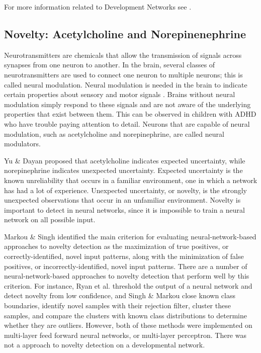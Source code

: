 \documentclass[conference]{IEEEtran}
\begin{document}
For more information related to Development Networks see \cite{WengIJCNN11,Weng3ThmRpt11}.

\subsection{Novelty: Acetylcholine and Norepinenephrine}
Neurotransmitters are chemicals that allow the transmission of signals across synapses from one neuron to another. In the brain, several classes of neurotransmitters are used to connect one neuron to multiple neurons; this is called neural modulation. Neural modulation is needed in the brain to indicate certain properties about
sensory and motor signals \cite{WengNAI12}. Brains without neural modulation simply
respond to these signals and are not aware of the underlying properties that exist between them. This can be observed in children with ADHD who have trouble paying attention to detail. Neurons that are capable of neural modulation, such as acetylcholine and norepinephrine, are called neural modulators.

Yu \& Dayan \cite{Yu05} proposed that acetylcholine indicates expected uncertainty, while norepinephrine indicates unexpected uncertainty. Expected uncertainty is the known unreliability that occurs in a familiar environment, one in which a network has had a lot of experience. Unexpected uncertainty, or novelty, is the strongly unexpected observations that occur in an unfamiliar environment. Novelty is important to detect in neural networks, since it is impossible to train a neural network on all possible input.

Markou \& Singh \cite{Markou03} identified the main criterion for evaluating neural-network-based approaches to novelty detection as the maximization of true positives, or correctly-identified, novel input patterns, along with the minimization of false positives, or incorrectly-identified, novel input patterns. There are a number of neural-network-based approaches to novelty detection that perform well by this criterion. For instance, Ryan et al. \cite{Ryan98} threshold the output of a neural network and detect novelty from low confidence, and Singh \& Markou \cite{Singh04} close known class boundaries, identify novel samples with their rejection filter, cluster these samples, and compare the clusters with known class distributions to determine whether they are outliers. However, both of these methods were implemented on multi-layer feed forward neural networks, or multi-layer perceptron. There was not a approach to novelty detection on a developmental network.
\end{document}

